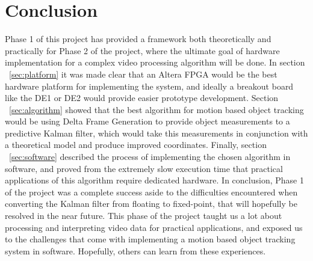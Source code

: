 \documentclass[12pt]{article} %
\begin{document}
\section{Conclusion}
Phase 1 of this project has provided a framework both theoretically and practically for Phase 2 of the project, where the ultimate goal of hardware implementation for a complex video processing algorithm will be done. In section ~\ref{sec:platform} it was made clear that an Altera FPGA would be the best hardware platform for implementing the system, and ideally a breakout board like the DE1 or DE2 would provide easier prototype development. Section ~\ref{sec:algorithm} showed that the best algorithm for motion based object tracking would be using Delta Frame Generation to provide object measurements to a predictive Kalman filter, which would take this measurements in conjunction with a theoretical model and produce improved coordinates. Finally, section ~\ref{sec:software} described the process of implementing the chosen algorithm in software, and proved from the extremely slow execution time that practical applications of this algorithm require dedicated hardware. In conclusion, Phase 1 of the project was a complete success aside to the difficulties encountered when converting the Kalman filter from floating to fixed-point, that will hopefully be resolved in the near future. This phase of the project taught us a lot about processing and interpreting video data for practical applications, and exposed us to the challenges that come with implementing a motion based object tracking system in software. Hopefully, others can learn from these experiences. 
\newpage
\end{document}
